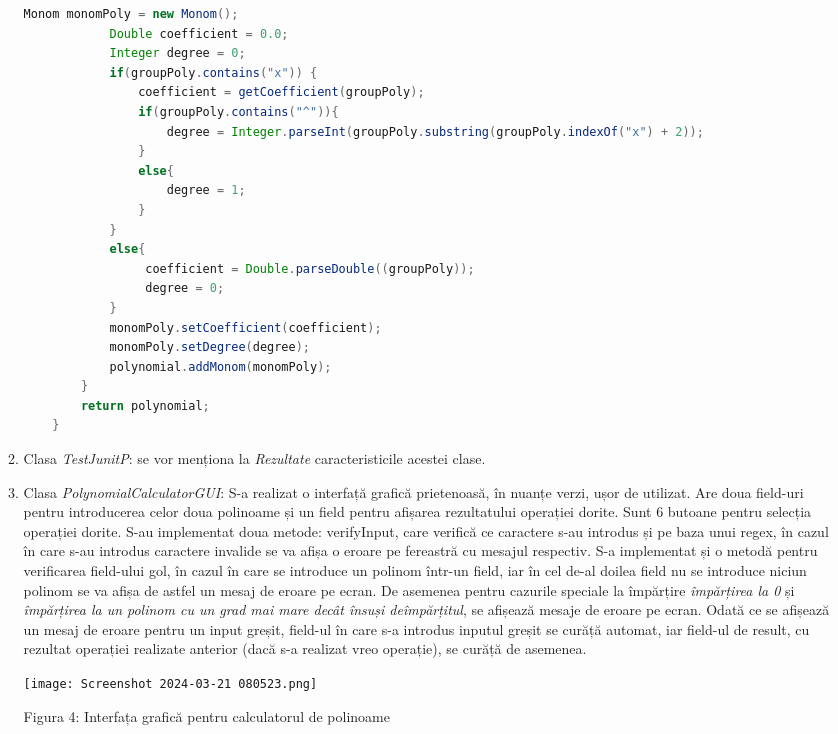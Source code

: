 \documentclass[a4paper,12pt]{article}
\begin{document}
\begin{enumerate}
\begin{enumerate}
\begin{lstlisting}[language = Java]
            Monom monomPoly = new Monom();
            Double coefficient = 0.0;
            Integer degree = 0;
            if(groupPoly.contains("x")) {
                coefficient = getCoefficient(groupPoly);
                if(groupPoly.contains("^")){
                    degree = Integer.parseInt(groupPoly.substring(groupPoly.indexOf("x") + 2));
                }
                else{
                    degree = 1;
                }
            }
            else{
                 coefficient = Double.parseDouble((groupPoly));
                 degree = 0;
            }
            monomPoly.setCoefficient(coefficient);
            monomPoly.setDegree(degree);
            polynomial.addMonom(monomPoly);
        }
        return polynomial;
    }
\end{lstlisting}
\newline
\item Clasa \emph{TestJunitP}: se vor menționa la \emph{Rezultate} caracteristicile acestei clase.
\item Clasa \emph{PolynomialCalculatorGUI}: 
S-a realizat o interfață grafică prietenoasă, în nuanțe verzi, ușor de utilizat. Are doua field-uri pentru introducerea celor doua polinoame și un field pentru afișarea rezultatului operației dorite. Sunt 6 butoane pentru selecția operației dorite. 
S-au implementat doua metode: verifyInput, care verifică ce caractere s-au introdus și pe baza unui regex, în cazul în care s-au introdus caractere invalide se va afișa o eroare pe fereastră cu mesajul respectiv. S-a implementat și o metodă pentru verificarea field-ului gol, în cazul în care se introduce un polinom într-un field, iar în cel de-al doilea field nu se introduce niciun polinom se va afișa de astfel un mesaj de eroare pe ecran.
De asemenea pentru cazurile speciale la împărțire \emph{împărțirea la 0} și \emph{împărțirea la un polinom cu un grad mai mare decât însuși deîmpărțitul}, se afișează mesaje de eroare pe ecran. Odată ce se afișează un mesaj de eroare pentru un input greșit, field-ul în care s-a introdus inputul greșit se curăță automat, iar field-ul de result, cu rezultat operației realizate anterior (dacă s-a realizat vreo operație), se curăță de asemenea.

\begin{center}
\texttt{[image: Screenshot 2024-03-21 080523.png]}
\end{center}
\begin{center}
    \caption{Figura 4: Interfața grafică pentru calculatorul de polinoame}
\end{center}


\end{enumerate}
\end{enumerate}
\end{document}
